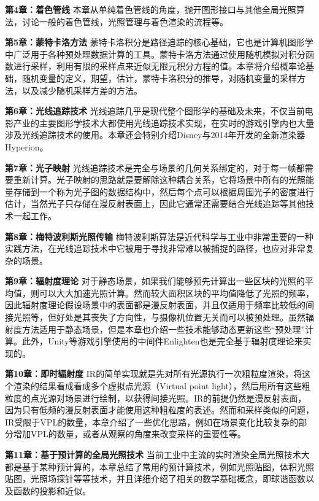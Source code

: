 \textbf{第4章：着色管线 } 本章从单纯着色管线的角度，抛开图形接口与其他全局光照算法，讨论一般的着色管线，光照管理与着色渲染的流程等。

\textbf{第5章：蒙特卡洛方法 } 蒙特卡洛积分是路径追踪的核心基础，它也是计算机图形学中广泛用于各种预处理数据计算的工具。蒙特卡洛方法通过使用随机模拟对积分函数进行采样，利用有限的采样点来近似无限元积分方程的值。本章将介绍概率论基础，随机变量的定义，期望，估计，蒙特卡洛积分的推导，对随机变量的采样方法，以及减少随机采样方差的方法。

\textbf{第6章：光线追踪技术 } 光线追踪几乎是现代整个图形学的基础及未来，不仅当前电影产业的主要图形学技术大都使用光线追踪技术实现，在实时的游戏引擎内也大量涉及光线追踪技术的使用。本章还会特别介绍Disney与2014年开发的全新渲染器Hyperion。

\textbf{第7章：光子映射 } 光线追踪技术是完全与场景的几何关系绑定的，对于每一帧都需要重新计算。光子映射的思路就是要解除这种耦合关系，它将场景中所有的光照能量存储到一个称为光子图的数据结构中，然后每个点可以根据周围光子的密度进行估计，当然光子只存储在漫反射表面上，因此它通常还需要结合光线追踪等其他技术一起工作。

\textbf{第8章：梅特波利斯光照传输 } 梅特波利斯算法是近代科学与工业中非常重要的一种实践方法，在光线追踪技术中它被用于寻找非常难以被捕捉的路径，也应对非常复杂的场景。


\textbf{第9章：辐射度理论 } 对于静态场景，如果我们能够预先计算出一些区块的光照的平均值，则可以大大加速光照计算。然而较大面积区块的平均值降低了光照的频率，因此辐射度理论假设场景中的表面都是漫反射表面，并且仅适用于频率比较低的间接光照等，但好处是其丧失了方向性，与摄像机位置无关而可以被预处理。虽然辐射度方法适用于静态场景，但是本章也介绍一些技术能够动态更新这些“预处理”计算。此外，Unity等游戏引擎使用的中间件Enlighten也是完全基于辐射度理论来实现的。


\textbf{第10章：即时辐射度 } IR的简单实现就是先对所有光源执行一次粗粒度渲染，将这个渲染的结果看成看成多个虚拟点光源（Virtual point light），然后用所有这些粗粒度的点光源对场景进行绘制，以获得间接光照。IR的前提仍然是漫反射表面，因为只有低频的漫反射表面才能使用这种粗粒度的表述。然而和采样类似的问题，IR受限于VPL的数量，本章介绍了一些优化思路，例如在场景变化比较复杂的部分增加VPL的数量，或者从观察的角度来改变采样的重要性等。

\textbf{第11章：基于预计算的全局光照技术 } 当前工业中主流的实时渲染全局光照技术大都是基于某种预计算的，本章总结了常用的预计算技术，例如光照贴图，体积光照贴图，光照场探针等等技术，并且详细介绍了相关的数学基础概念，即球谐函数以及函数的投影和近似。


